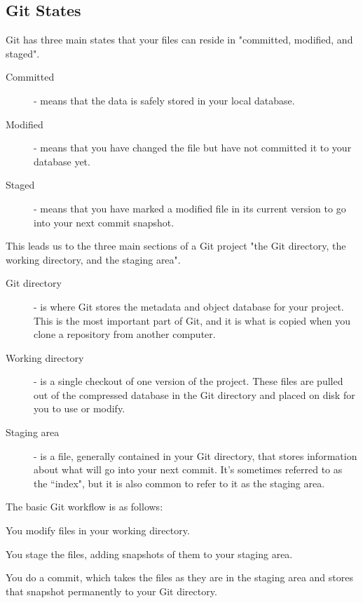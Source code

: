 \documentclass{book}
\begin{document}
    \subsection*{Git States}
    Git has three main states that your files can reside in "committed, modified, and staged".

    \begin{description}
        \item [Committed] - means that the data is safely stored in your local database.
        \item [Modified] - means that you have changed the file but have not committed it to your database yet.
        \item [Staged] - means that you have marked a modified file in its current version to go into your next commit snapshot.
    \end{description}

    This leads us to the three main sections of a Git project "the Git directory, the working directory, and the staging area".

    \begin{description}
        \item [Git directory] - is where Git stores the metadata and object database for your project. This is the most important part of Git, and it is what is copied when you clone a repository from another computer.

        \item [Working directory] - is a single checkout of one version of the project. These files are pulled out of the compressed database in the Git directory and placed on disk for you to use or modify.

        \item [Staging area] - is a file, generally contained in your Git directory, that stores information about what will go into your next commit. It’s sometimes referred to as the ``index", but it is also common to refer to it as the staging area.
    \end{description}

    The basic Git workflow is as follows:
    \begin{description}
        \item You modify files in your working directory.
        \item You stage the files, adding snapshots of them to your staging area.
        \item You do a commit, which takes the files as they are in the staging area and stores that snapshot permanently to your Git directory.
    \end{description}
\end{document}

